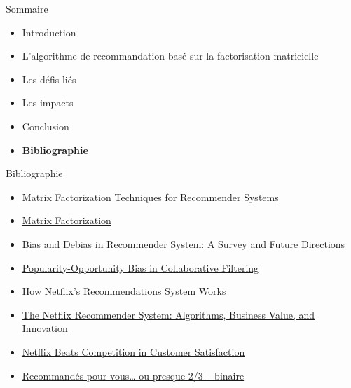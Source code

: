 \begin{frame}{Sommaire}
    \begin{itemize}
        \item Introduction
        \item L'algorithme de recommandation basé sur la factorisation matricielle
        \item Les défis liés
        \item Les impacts
        \item Conclusion
        \item \textbf{Bibliographie}
    \end{itemize}
\end{frame}

\begin{frame}{Bibliographie}
    \begin{itemize}
        \item\href{https://datajobs.com/data-science-repo/Recommender-Systems-\%5BNetflix\%5D.pdf}{Matrix Factorization Techniques for Recommender Systems}\\
        \item\href{https://developers.google.com/machine-learning/recommendation/collaborative/matrix}{Matrix Factorization}\\
        \item\href{https://arxiv.org/pdf/2010.03240.pdf}{Bias and Debias in Recommender System: A Survey and Future Directions}\\
        \item\href{https://dl.acm.org/doi/pdf/10.1145/3437963.3441820}{Popularity-Opportunity Bias in Collaborative Filtering }\\
        \item\href{https://help.netflix.com/en/node/100639}{How Netflix’s Recommendations System Works}\\
        \item\href{https://dl.acm.org/doi/pdf/10.1145/2843948}{The Netflix Recommender System: Algorithms, Business Value, and Innovation}\\
        \item\href{https://www.statista.com/chart/7893/customer-satisfaction-video-streaming-services/}{Netflix Beats Competition in Customer Satisfaction}\\
        \item\href{https://www.lemonde.fr/blog/binaire/2022/09/13/recommandes-pour-vous-ou-presque-2-3/}{Recommandés pour vous… ou presque 2/3 – binaire}\\
    \end{itemize}
\end{frame}